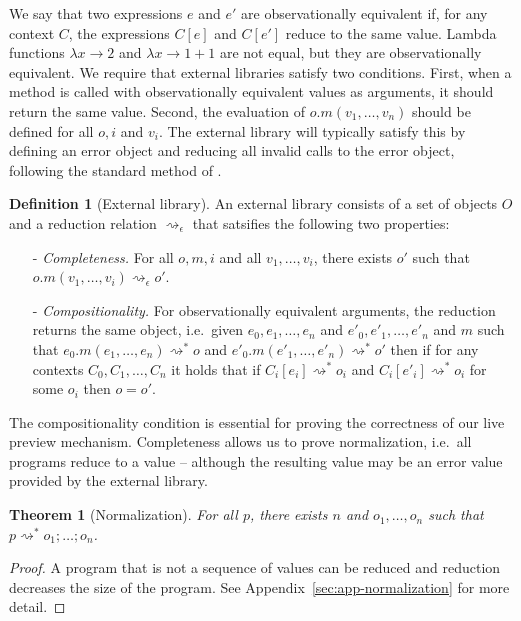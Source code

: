 \documentclass[acmsmall,anonymous,fleqn]{acmart}\settopmatter{printfolios=false,printccs=false,printacmref=false}
\newcounter{thc}
\newcounter{dfc}
\theoremstyle{plain}
\newtheorem{theorem}[thc]{Theorem}
\theoremstyle{definition}
\newtheorem{definition}[dfc]{Definition}
\begin{document}
\noindent
We say that two expressions
$e$ and $e'$ are observationally equivalent if, for any context $C$, the expressions $C[e]$ and
$C[e']$ reduce to the same value. Lambda functions $\lambda x\!\rightarrow\!2$ and
$\lambda x\!\rightarrow\!1\!+\!1$ are not equal, but they are observationally equivalent.
We require that external libraries satisfy two conditions. First, when a method is called with
observationally equivalent values as arguments, it should return the same value. Second, the
evaluation of $o.m(v_1,\ldots,v_n)$ should be defined for all $o, i$ and $v_i$. The external
library will typically satisfy this by defining an error object and reducing all invalid calls
to the error object, following the standard method of \citet{gowrong}.

\begin{definition}[External library]
\label{def:external}
An external library consists of a set of objects $O$ and a reduction relation
$\rightsquigarrow_\epsilon$ that satsifies the following two properties:
\begin{itemize}
\item[-] \emph{Completeness.} For all $o, m, i$ and all $v_1, \ldots, v_i$, there exists $o'$ such
  that $o.m(v_1, \ldots, v_i) \rightsquigarrow_\epsilon o'$.
\vspace{0.5em}
\item[-] \emph{Compositionality.} For observationally equivalent arguments, the reduction returns
  the same object, i.e.~given $e_0, e_1, \ldots, e_n$ and $e'_0, e'_1, \ldots, e'_n$ and $m$ such that
  $e_0.m(e_1, \ldots, e_n) \rightsquigarrow^{*} o$ and $e'_0.m(e'_1, \ldots, e'_n) \rightsquigarrow^{*} o'$ then
  if for any contexts $C_0, C_1, \ldots, C_n$ it holds that if $C_i[e_i] \rightsquigarrow^{*} o_i$ and
  $C_i[e'_i] \rightsquigarrow^{*} o_i$ for some $o_i$ then $o = o'$.
\end{itemize}
\end{definition}

\noindent
The compositionality condition is essential for proving the correctness of our live preview mechanism.
Completeness allows us to prove normalization, i.e.~all programs reduce to
a value -- although the resulting value may be an error value provided by the external library.

\begin{theorem}[Normalization]
\label{thm:normalization}
For all $p$, there exists $n$ and $o_1, \ldots, o_n$ such that $p\rightsquigarrow^{*} o_1;\ldots;o_n$.
\end{theorem}
\begin{proof}
A program that is not a sequence of values can be reduced and reduction decreases the size of the
program. See Appendix~\ref{sec:app-normalization} for more detail.
\end{proof}
\end{document}
